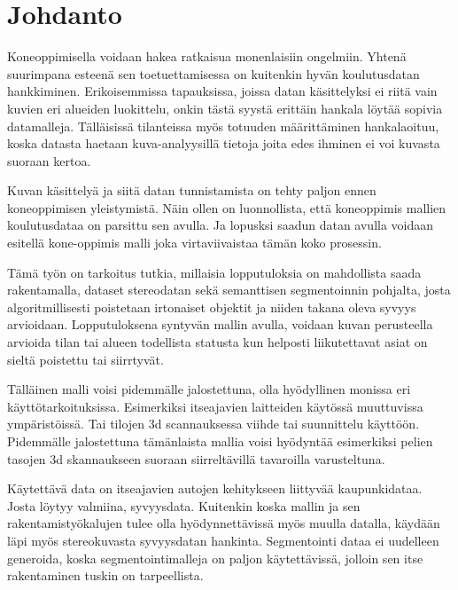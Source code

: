 \chapter{Johdanto}%
\label{ch:johdanto}


Koneoppimisella voidaan hakea ratkaisua monenlaisiin ongelmiin. Yhtenä suurimpana esteenä sen toetuettamisessa on kuitenkin hyvän koulutusdatan hankkiminen. Erikoisemmissa tapauksissa, joissa datan käsittelyksi ei riitä vain kuvien eri alueiden luokittelu, onkin tästä syystä erittäin hankala löytää sopivia datamalleja. Tälläisissä tilanteissa myös totuuden määrittäminen hankalaoituu, koska datasta haetaan kuva-analyysillä tietoja joita edes ihminen ei voi kuvasta suoraan kertoa.

Kuvan käsittelyä ja siitä datan tunnistamista on tehty paljon ennen koneoppimisen yleistymistä. Näin ollen on luonnollista, että koneoppimis mallien koulutusdataa on parsittu sen avulla. Ja lopusksi saadun datan avulla voidaan esitellä kone-oppimis malli joka virtaviivaistaa tämän koko prosessin.

Tämä työn on tarkoitus tutkia, millaisia lopputuloksia on mahdollista saada rakentamalla, dataset stereodatan sekä semanttisen segmentoinnin pohjalta, josta algoritmillisesti poistetaan irtonaiset objektit ja niiden takana oleva syvyys arvioidaan. Lopputuloksena syntyvän mallin avulla, voidaan kuvan perusteella arvioida tilan tai alueen todellista statusta kun helposti liikutettavat asiat on sieltä poistettu tai siirrtyvät.

Tälläinen malli voisi pidemmälle jalostettuna, olla hyödyllinen monissa eri käyttötarkoituksissa. Esimerkiksi itseajavien laitteiden käytössä muuttuvissa ympäristöissä. Tai tilojen 3d scannauksessa viihde tai suunnittelu käyttöön. Pidemmälle jalostettuna tämänlaista mallia voisi hyödyntää esimerkiksi pelien tasojen 3d skannaukseen suoraan siirreltävillä tavaroilla varusteltuna.

Käytettävä data on itseajavien autojen kehitykseen liittyvää kaupunkidataa. Josta löytyy valmiina, syvyysdata. Kuitenkin koska mallin ja sen rakentamistyökalujen tulee olla hyödynnettävissä myös muulla datalla, käydään läpi myös stereokuvasta syvyysdatan hankinta. Segmentointi dataa ei uudelleen generoida, koska segmentointimalleja on paljon käytettävissä, jolloin sen itse rakentaminen tuskin on tarpeellista.

